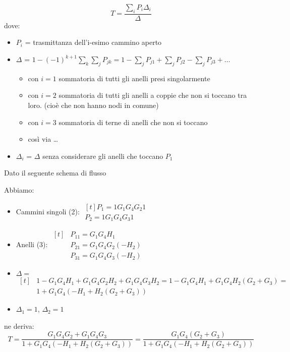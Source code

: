 \begin{equation*}
	T=\frac{\displaystyle\sum_{i}P_i \Delta_i}{\Delta}
\end{equation*}
dove:
\begin{itemize}
	\item $ P_i $ = trasmittanza dell'i-esimo cammino aperto
	\item $ \Delta $ = $\displaystyle 1-(-1)^{k+1}\sum_k\sum_j P_{jk}=1-\sum_j P_{j1}+\sum_j P_{j2}-\sum_j P_{j3}+\dots $
	\begin{itemize}
		\item con $ i=1 $ sommatoria di tutti gli anelli presi singolarmente
		\item con $ i=2 $ sommatoria di tutti gli anelli a coppie che non si toccano tra loro. (cioè che non hanno nodi in comune)
		\item con $ i=3 $ sommatoria di terne di anelli che non si toccano
		\item così via \dots
	\end{itemize}
	\item $ \Delta_i $ = $ \Delta $ senza considerare gli anelli che toccano $ P_1 $
\end{itemize}

\begin{nexample} Dato il seguente schema di flusso
	
	\begin{center}
		
	\end{center}
	Abbiamo:
	\begin{itemize}
		\item Cammini singoli (2):
		$\begin{aligned}[t]
			P_1 = 1 G_1 G_4 G_2 1 \\ P_2 = 1 G_1 G_4 G_3 1 
		\end{aligned}$
		\item Anelli (3):  
		$\begin{aligned}[t]
			&P_{11} = G_1 G_4 H_1\\&P_{21} = G_1 G_4 G_2 (-H_2)\\&P_{31} = G_1 G_4 G_3 (-H_2)
		\end{aligned}$
		
		\item$ \Delta =$
		$\begin{aligned}[t] 
		&1-G_1G_4H_1+G_1G_4G_2H_2+G_1G_4G_3H_2 = 1-G_1 G_4 H_1 +G_1 G_4 H_2(G_2 + G_3) =\\& 1+G_1 G_4 (-H_1 + H_2(G_2 + G_3))
		\end{aligned}$
		\item$ \Delta_1 = 1 $, $ \Delta_2 = 1 $
	\end{itemize}
ne deriva:
\begin{equation*}
	T=\frac{G_1 G_4 G_2 + G_1 G_4 G_3}{1+G_1 G_4 (-H_1 + H_2(G_2 + G_3))}=\frac{G_1 G_4 (G_2 + G_3)}{1+G_1 G_4 (-H_1 + H_2(G_2 + G_3))}
\end{equation*}
\end{nexample}
	
	

